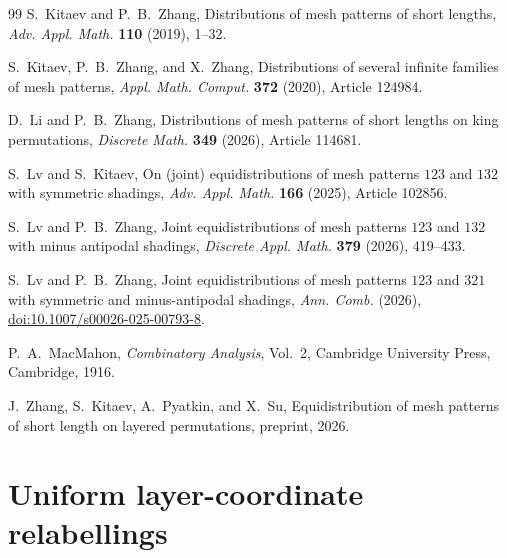 \documentclass[12pt]{article}
\begin{document}
\begin{thebibliography}{99}
S.~Kitaev and P.~B.~Zhang,
Distributions of mesh patterns of short lengths,
\emph{Adv. Appl. Math.} \textbf{110} (2019), 1--32.

S.~Kitaev, P.~B.~Zhang, and X.~Zhang,
Distributions of several infinite families of mesh patterns,
\emph{Appl. Math. Comput.} \textbf{372} (2020), Article 124984.

D.~Li and P.~B.~Zhang,
Distributions of mesh patterns of short lengths on king permutations,
\emph{Discrete Math.} \textbf{349} (2026), Article 114681.

S.~Lv and S.~Kitaev,
On (joint) equidistributions of mesh patterns $123$ and $132$ with symmetric
shadings,
\emph{Adv. Appl. Math.} \textbf{166} (2025), Article 102856.

S.~Lv and P.~B.~Zhang,
Joint equidistributions of mesh patterns $123$ and $132$ with minus antipodal
shadings,
\emph{Discrete Appl. Math.} \textbf{379} (2026), 419--433.

S.~Lv and P.~B.~Zhang,
Joint equidistributions of mesh patterns $123$ and $321$ with symmetric and
minus-antipodal shadings,
\emph{Ann. Comb.} (2026),
\href{https://doi.org/10.1007/s00026-025-00793-8}
{doi:10.1007/s00026-025-00793-8}.

P.~A.~MacMahon,
\emph{Combinatory Analysis}, Vol.~2,
Cambridge University Press, Cambridge, 1916.

J.~Zhang, S.~Kitaev, A.~Pyatkin, and X.~Su,
Equidistribution of mesh patterns of short length on layered permutations,
preprint, 2026.

\end{thebibliography}

\appendix

\section{Uniform layer-coordinate relabellings}
\label{app:coordinate-relabellings}
\end{document}

